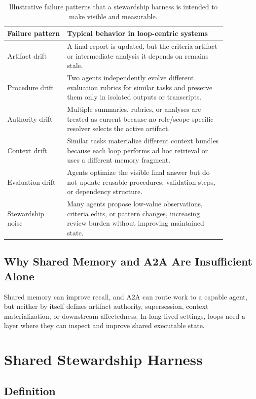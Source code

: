 \documentclass{article}
\begin{document}
\begin{table}[H]
\centering
\small
\begin{tabular}{p{0.24\linewidth}p{0.64\linewidth}}
\toprule
\textbf{Failure pattern} & \textbf{Typical behavior in loop-centric systems} \\
\midrule
Artifact drift & A final report is updated, but the criteria artifact or intermediate analysis it depends on remains stale. \\
Procedure drift & Two agents independently evolve different evaluation rubrics for similar tasks and preserve them only in isolated outputs or transcripts. \\
Authority drift & Multiple summaries, rubrics, or analyses are treated as current because no role/scope-specific resolver selects the active artifact. \\
Context drift & Similar tasks materialize different context bundles because each loop performs ad hoc retrieval or uses a different memory fragment. \\
Evaluation drift & Agents optimize the visible final answer but do not update reusable procedures, validation steps, or dependency structure. \\
Stewardship noise & Many agents propose low-value observations, criteria edits, or pattern changes, increasing review burden without improving maintained state. \\
\bottomrule
\end{tabular}
\caption{Illustrative failure patterns that a stewardship harness is intended to make visible and measurable.}
\label{tab:failure-patterns}
\end{table}

\subsection{Why Shared Memory and A2A Are Insufficient Alone}

Shared memory can improve recall, and A2A can route work to a capable agent, but neither by itself defines artifact authority, supersession, context materialization, or downstream affectedness. In long-lived settings, loops need a layer where they can inspect and improve shared executable state.

\section{Shared Stewardship Harness}

\subsection{Definition}
\end{document}
